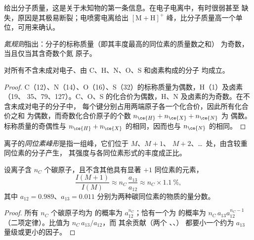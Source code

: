 给出分子质量，这是关于未知物的第一条信息。在电子电离中，有时很弱甚至
缺失，原因是其极易断裂；电喷雾电离给出 $[\mathrm M +
\mathrm H]^+$ 峰，比分子质量高一个单位，可用来确认。

\begin{definition}[氮规则]\label{def:b2:mass-spec-atomic:nitrogen-rule}
\emph{氮规则}指出：分子的标称质量（即其丰度最高的同位素的质量数之和）
为奇数，当且仅当其含奇数个氮
原子。
\end{definition}

\begin{proposition}[氮规则的有效性]\label{prop:b2:mass-spec-atomic:nitrogen-rule}
对所有不含未成对电子、由 C、H、N、O、S 和卤素构成的分子
均成立。
\end{proposition}

\begin{proof}
C（12）、N（14）、O（16）、S（32）的标称质量为偶数，H（1）及卤素（19、
35、79、127）。C、O、S 的化合价为偶数，H、N 及卤素的为奇数。在不含未成对电子的分子中，
每个键分别占用两端原子各一个化合价，因此所有化合价之和
为偶数，而奇数化合价原子的个数 $n_{\ce{H}} + n_{\ce{X}} + n_{\ce{N}}$ 为
偶数。标称质量的奇偶性与 $n_{\ce{H}} + n_{\ce{X}}$ 的相同，因而也与
$n_{\ce{N}}$ 的相同。
\end{proof}

\begin{definition}[同位素峰形]\label{def:b2:mass-spec-atomic:isotope-pattern}
离子的\emph{同位素峰形}是指一组峰，它们位于 $M$、$M+1$、
$M+2$、\dots\ 处，由含较重同位素的分子产生，
其强度与各同位素形式的丰度成正比。
\end{definition}

\begin{proposition}[$M+1$ 峰]\label{prop:b2:mass-spec-atomic:m-plus-one}
设离子含 $n_C$ 个碳原子，且不含其他具有显著 $+1$ 同位素的元素，
\begin{equation*}
\frac{I(M+1)}{I(M)} \approx n_C\,\frac{a_{13}}{a_{12}} \approx n_C \times 1.1~\%,
\end{equation*}
其中 $a_{12} = 0.989$、$a_{13} = 0.011$ 分别为两种碳同位素的物质的量分数。
\end{proposition}

\begin{proof}
所有 $n_C$ 个碳原子均为  的概率为 $a_{12}^{n_C}$；恰有一个为
 的概率为 $n_C\,a_{13}a_{12}^{n_C - 1}$（二项定律）。比值为 $n_C\,a_{13}/a_{12}$，而
其余贡献（两个 、、）
都要小一个约为 $a_{13}$ 量级或更小的因子。
\end{proof}

